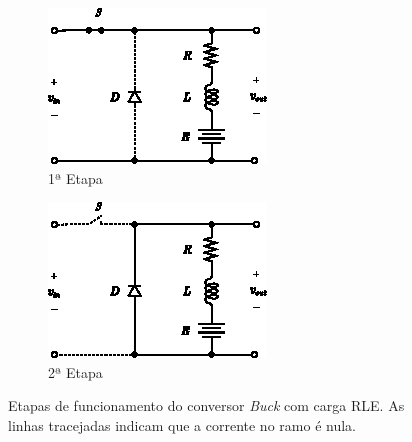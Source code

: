 \begin{figure}[H]
  \captionsetup{justification=centering}
  \centering
  \begin{subfigure}[t]{0.33\textwidth}
    \centering
    \includegraphics[width=\textwidth]{figuras/buck_converter_rle_s1.eps}
    \caption{1ª Etapa}
    \label{fig:buck_converter_rle_s1}
  \end{subfigure}
  \hfil
  \begin{subfigure}[t]{0.33\textwidth}
    \centering
    \includegraphics[width=\textwidth]{figuras/buck_converter_rle_s2.eps}
    \caption{2ª Etapa}
    \label{fig:buck_converter_rle_s2}
  \end{subfigure}
  \caption{Etapas de funcionamento do conversor \textit{Buck} com carga RLE. As linhas tracejadas indicam que a corrente no ramo é nula.}
\end{figure}

